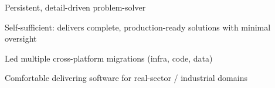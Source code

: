\documentclass[letter,10pt]{article}
\begin{document}
\begin{zitemize}
        \item Persistent, detail-driven problem-solver
        \item Self-sufficient: delivers complete, production-ready solutions with minimal oversight
        \item Led multiple cross-platform migrations (infra, code, data)
        \item Comfortable delivering software for real-sector / industrial domains
\end{zitemize}
\end{document}
